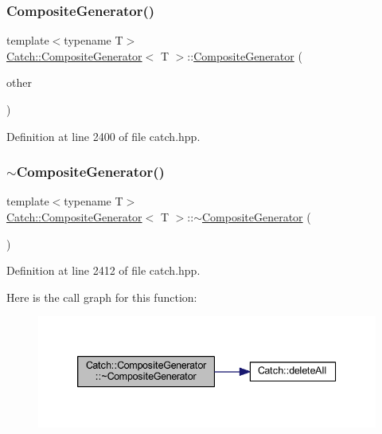 \subsubsection{\texorpdfstring{Composite\+Generator()}{CompositeGenerator()}\hspace{0.1cm}{\footnotesize\ttfamily [2/2]}}
{\footnotesize\ttfamily template$<$typename T$>$ \\
\hyperlink{class_catch_1_1_composite_generator}{Catch\+::\+Composite\+Generator}$<$ T $>$\+::\hyperlink{class_catch_1_1_composite_generator}{Composite\+Generator} (\begin{DoxyParamCaption}\item[{\hyperlink{class_catch_1_1_composite_generator}{Composite\+Generator}$<$ T $>$ \&}]{other }\end{DoxyParamCaption})\hspace{0.3cm}{\ttfamily [inline]}}



Definition at line 2400 of file catch.\+hpp.

\hypertarget{class_catch_1_1_composite_generator_a5766205abd7004c508c20ddbb5e5555e}{}\label{class_catch_1_1_composite_generator_a5766205abd7004c508c20ddbb5e5555e} 
\subsubsection{\texorpdfstring{$\sim$\+Composite\+Generator()}{~CompositeGenerator()}}
{\footnotesize\ttfamily template$<$typename T$>$ \\
\hyperlink{class_catch_1_1_composite_generator}{Catch\+::\+Composite\+Generator}$<$ T $>$\+::$\sim$\hyperlink{class_catch_1_1_composite_generator}{Composite\+Generator} (\begin{DoxyParamCaption}{ }\end{DoxyParamCaption})\hspace{0.3cm}{\ttfamily [inline]}}



Definition at line 2412 of file catch.\+hpp.

Here is the call graph for this function\+:\nopagebreak
\begin{figure}[H]
\begin{center}
\leavevmode
\includegraphics[width=339pt]{class_catch_1_1_composite_generator_a5766205abd7004c508c20ddbb5e5555e_cgraph}
\end{center}
\end{figure}


